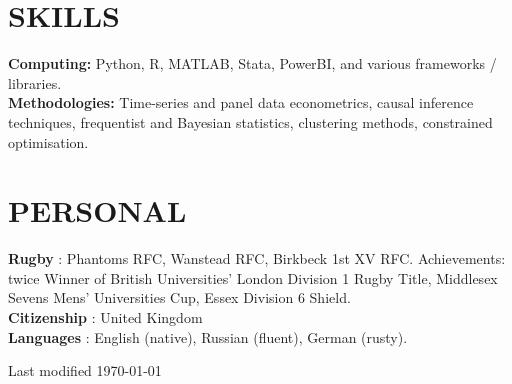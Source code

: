 \documentclass[letterpaper,11pt]{article}
\begin{document}
\section{SKILLS}
 \begin{itemize}[leftmargin=0in, label={}]
\small{\item{
\textbf{Computing: } {Python, R, MATLAB, Stata, PowerBI, and various frameworks / libraries.}\vspace{2pt} \\
\textbf{Methodologies: } {Time-series and panel data econometrics, causal inference techniques, frequentist and Bayesian statistics, clustering methods, constrained optimisation.}\vspace{2pt} \\

    }}
 \end{itemize}

\section{PERSONAL}
 \begin{itemize}[leftmargin=0in, label={}]
\small{\item{
\textbf{Rugby} {: Phantoms RFC, Wanstead RFC, Birkbeck 1st XV RFC. Achievements: twice Winner of British Universities' London Division 1 Rugby Title, Middlesex Sevens Mens' Universities Cup, Essex Division 6 Shield.}\vspace{2pt} \\
\textbf{Citizenship}     {: United Kingdom} \\    
\textbf{Languages}     {: English (native), Russian (fluent), German (rusty).} \\  
    }}
 \end{itemize} 

\footnotesize
\vfill
Last modified \today
\end{document}
